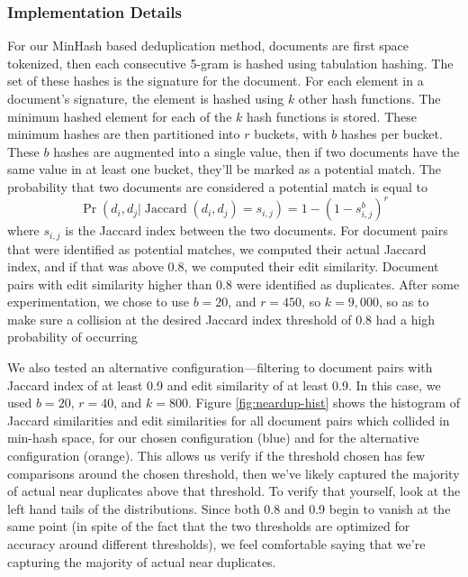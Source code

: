 \subsubsection{Implementation Details}
\label{section:minhash_details}
For our MinHash based deduplication method, documents are first space tokenized, then each consecutive 5-gram is hashed using tabulation hashing.
The set of these hashes is the signature for the document.
For each element in a document's signature, the element is hashed using $k$ other hash functions.
The minimum hashed element for each of the $k$ hash functions is stored.
These minimum hashes are then partitioned into $r$ buckets, with $b$ hashes per bucket.
These $b$ hashes are augmented into a single value, then if two documents have the same value in at least one bucket, they'll be marked as a potential match.
The probability that two documents are considered a potential match is equal to
\begin{equation}
\operatorname{Pr}(d_i, d_j | \operatorname{Jaccard}(d_i, d_j) = s_{i, j}) = 1 - (1 - s_{i, j}^b)^r
\end{equation}
where $s_{i,j}$ is the Jaccard index between the two documents.
For document pairs that were identified as potential matches, we computed their actual Jaccard index, and if that was above 0.8, we computed their edit similarity.
Document pairs with edit similarity higher than 0.8 were identified as duplicates.
After some experimentation, we chose to use $b=20$, and $r=450$, so $k=9,000$, so as to make sure a collision at the desired Jaccard index threshold of 0.8 had a high probability of occurring

We also tested an alternative configuration---filtering to document pairs with Jaccard index of at least 0.9 and edit similarity of at least 0.9.
In this case, we used $b=20$, $r=40$, and $k=800$.
Figure \ref{fig:neardup-hist} shows the histogram of Jaccard similarities and edit similarities for all document pairs which collided in min-hash space, for our chosen configuration (blue) and for the alternative configuration (orange).
This allows us verify if the threshold chosen has few comparisons around the chosen threshold, then we've likely captured the majority of actual near duplicates above that threshold. To verify that yourself, look at the left hand tails of the distributions. Since both 0.8 and 0.9 begin to vanish at the same point (in spite of the fact that the two thresholds are optimized for accuracy around different thresholds), we feel comfortable saying that we're capturing the majority of actual near duplicates. 


